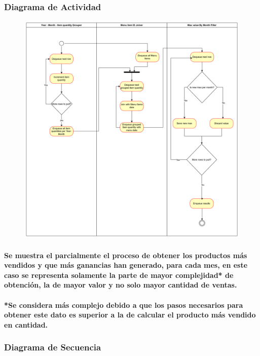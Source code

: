 \documentclass[titlepage,a4paper]{article}
\begin{document}
\subsubsection{Diagrama de Actividad}
\begin{figure}[H]
    \centering
    \includegraphics[width=1\linewidth]{actividad.png}
\end{figure}
\paragraph{Se muestra el parcialmente el proceso de obtener los productos más vendidos y que más ganancias han generado, para cada mes, en este caso se representa solamente la parte de mayor complejidad* de obtención, la de mayor valor y no solo mayor cantidad de ventas.}

\paragraph{*Se considera más complejo debido a que los pasos necesarios para obtener este dato es superior a la de calcular el producto más vendido en cantidad.}

\subsubsection{Diagrama de Secuencia}
\end{document}
